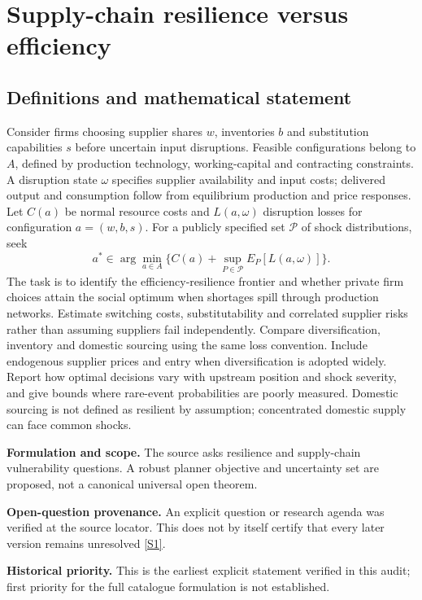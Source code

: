 \documentclass[11pt]{article}
\newcommand{\sref}[2]{\hyperlink{source:#1:#2}{[S#2]}}
\begin{document}
\section*{Supply-chain resilience versus efficiency}\label{30007627}
\subsection{Definitions and mathematical statement}
Consider firms choosing supplier shares \(w\), inventories \(b\) and substitution capabilities \(s\) before uncertain input disruptions. Feasible configurations belong to \(A\), defined by production technology, working-capital and contracting constraints. A disruption state \(\omega\) specifies supplier availability and input costs; delivered output and consumption follow from equilibrium production and price responses. Let \(C(a)\) be normal resource costs and \(L(a,\omega)\) disruption losses for configuration \(a=(w,b,s)\). For a publicly specified set \(\mathcal P\) of shock distributions, seek
\[a^*\in\arg\min_{a\in A}\{C(a)+\sup_{P\in\mathcal P}E_P[L(a,\omega)]\}.\]
The task is to identify the efficiency-resilience frontier and whether private firm choices attain the social optimum when shortages spill through production networks. Estimate switching costs, substitutability and correlated supplier risks rather than assuming suppliers fail independently. Compare diversification, inventory and domestic sourcing using the same loss convention. Include endogenous supplier prices and entry when diversification is adopted widely. Report how optimal decisions vary with upstream position and shock severity, and give bounds where rare-event probabilities are poorly measured. Domestic sourcing is not defined as resilient by assumption; concentrated domestic supply can face common shocks.

\par\textbf{Formulation and scope.} The source asks resilience and supply-chain vulnerability questions. A robust planner objective and uncertainty set are proposed, not a canonical universal open theorem.

\par\textbf{Open-question provenance.} An explicit question or research agenda was verified at the source locator. This does not by itself certify that every later version remains unresolved \sref{30007627}{1}.

\par\textbf{Historical priority.} This is the earliest explicit statement verified in this audit; first priority for the full catalogue formulation is not established.
\end{document}
